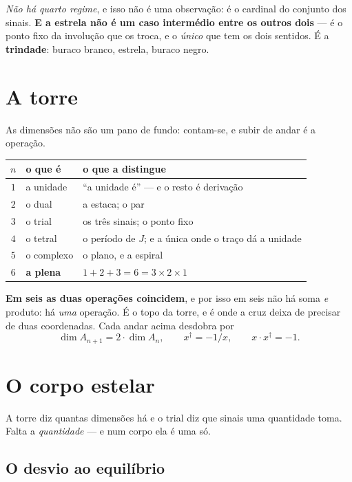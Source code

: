 \documentclass[11pt,a4paper]{article}
\newcommand{\dg}{^{\dagger}}
\begin{document}
\noindent \emph{Não há quarto regime}, e isso não é uma observação: é o cardinal do conjunto dos
sinais. \textbf{E a estrela não é um caso intermédio entre os outros dois} --- é o ponto fixo da
involução que os troca, e o \emph{único} que tem os dois sentidos. É a \textbf{trindade}: buraco
branco, estrela, buraco negro.

\section{A torre}

As dimensões não são um pano de fundo: contam-se, e subir de andar é a operação.

\begin{center}\small
\begin{tabular}{@{}cll@{}}
\toprule
$n$ & o que é & o que a distingue \\
\midrule
$1$ & a unidade & ``a unidade é'' --- e o resto é derivação \\
$2$ & o dual & a estaca; o par \\
$3$ & o trial & os três sinais; o ponto fixo \\
$4$ & o tetral & o período de $J$; e a única onde o traço dá a unidade \\
$5$ & o complexo & o plano, e a espiral \\
$6$ & \textbf{a plena} & $1+2+3=6=3\times2\times1$ \\
\bottomrule
\end{tabular}
\end{center}

\noindent \textbf{Em seis as duas operações coincidem}, e por isso em seis não há soma \emph{e}
produto: há \emph{uma} operação. É o topo da torre, e é onde a cruz deixa de precisar de duas
coordenadas. Cada andar acima desdobra por
\[
  \dim A_{n+1}=2\cdot\dim A_n, \qquad x\dg=-1/x, \qquad x\cdot x\dg=-1 .
\]

\section{O corpo estelar}\label{sec:corpo}

A torre diz quantas dimensões há e o trial diz que sinais uma quantidade toma. Falta a
\emph{quantidade} --- e num corpo ela é uma só.

\subsection*{O desvio ao equilíbrio}
\end{document}
